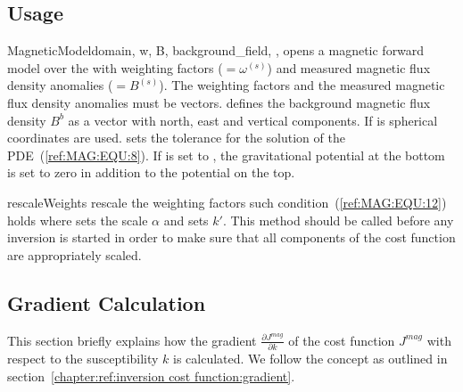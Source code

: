 \subsection{Usage}


\begin{classdesc}{MagneticModel}{domain, w, B, background_field,
        ,
        }
opens a magnetic forward model over the \Domain {} with 
weighting factors  ($=\omega^{(s)}$) and measured magnetic flux
density anomalies  ($=B^{(s)}$).
The weighting factors and the  measured magnetic flux density anomalies must be vectors.
 defines the background magnetic flux density $B^b$
as a vector with north, east and vertical components.
If  is \True spherical coordinates are used. 
 sets the tolerance for the solution of the PDE~(\ref{ref:MAG:EQU:8}).
If  is set to  \True, the gravitational potential 
at the bottom is set to zero in addition to the potential on the top. 
\end{classdesc}

\begin{methoddesc}[MagneticModel]{rescaleWeights}{
 }
rescale the weighting factors such condition~(\ref{ref:MAG:EQU:12}) holds where 
 sets the scale $\alpha$
and  sets $k'$. This method should be called before any inversion is started
in order to make sure that all components of the cost function are appropriately scaled.
\end{methoddesc}


\subsection{Gradient Calculation}
This section briefly explains how the gradient
$\frac{\partial J^{mag}}{\partial k}$ of the cost function $J^{mag}$ with
respect to the susceptibility $k$ is calculated.  We follow the concept as outlined in section~\ref{chapter:ref:inversion cost function:gradient}.


